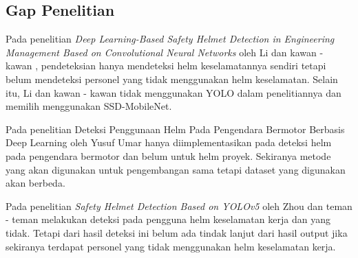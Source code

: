 \subsection{Gap Penelitian}
Pada penelitian \emph{Deep Learning-Based Safety Helmet Detection in Engineering Management Based on Convolutional Neural Networks} oleh Li dan kawan - kawan , pendeteksian hanya mendeteksi helm keselamatannya sendiri tetapi belum mendeteksi personel yang tidak menggunakan helm keselamatan. Selain itu, Li dan kawan - kawan tidak menggunakan YOLO dalam penelitiannya dan memilih menggunakan SSD-MobileNet.
\par Pada penelitian Deteksi Penggunaan Helm Pada Pengendara Bermotor Berbasis Deep Learning oleh Yusuf Umar hanya diimplementasikan pada deteksi helm pada pengendara bermotor dan belum untuk helm proyek. Sekiranya metode yang akan digunakan untuk pengembangan sama tetapi dataset yang digunakan akan berbeda.
\par Pada penelitian \emph{Safety Helmet Detection Based on YOLOv5} oleh Zhou dan teman - teman melakukan deteksi pada pengguna helm keselamatan kerja dan yang tidak. Tetapi dari hasil deteksi ini belum ada tindak lanjut dari hasil output jika
sekiranya terdapat personel yang tidak menggunakan helm keselamatan kerja. 
